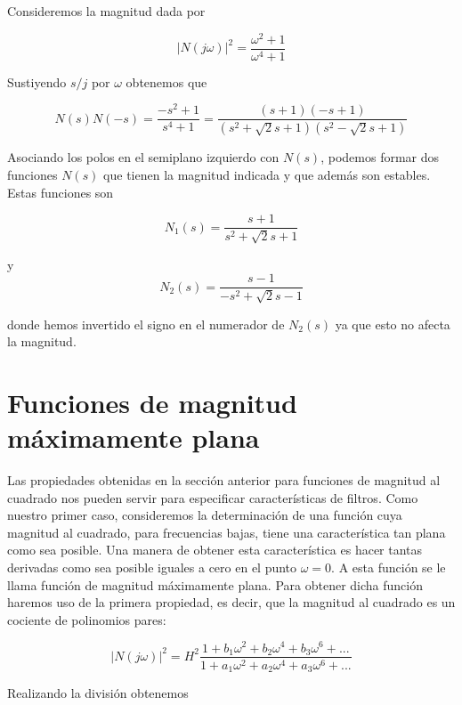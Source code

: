 \documentclass[12pt]{book}
\theoremstyle{definition}
\theoremstyle{remark}
\theoremstyle{plain}
\begin{document}
Consideremos la magnitud dada por

\begin{equation*}
|N(j\omega)|^2=\frac{\omega ^2+1}{\omega ^4 +1}
\end{equation*}

Sustiyendo $s/j$ por $\omega$ obtenemos que

\begin{equation*}
N(s) N(-s)=\frac{-s^2+1}{s^4+1}= \frac{(s+1)(-s+1)}{(s^2+\sqrt{2} s+1)(s^2-\sqrt{2}s+1)}
\end{equation*}

Asociando los polos en el semiplano izquierdo con $N(s)$, podemos formar dos funciones $N(s)$ que tienen la magnitud indicada y que además son estables. Estas funciones son

\begin{equation*}
N_1 (s)= \frac{s+1}{s^2+\sqrt{2} s+1}
\end{equation*}

y 
\begin{equation*}
N_2 (s)= \frac{s-1}{-s^2+\sqrt{2} s-1}
\end{equation*}

donde hemos invertido el signo en el numerador de $N_2 (s)$ ya que esto no afecta la magnitud.

\section{Funciones de magnitud máximamente plana}

Las propiedades obtenidas en la sección anterior para funciones de magnitud al cuadrado nos pueden servir para especificar características de filtros. Como nuestro primer caso, consideremos la determinación de una función cuya magnitud al cuadrado, para frecuencias bajas, tiene una característica tan plana como sea posible. Una manera de obtener esta característica es hacer tantas derivadas como sea posible iguales a cero en el punto $\omega= 0$. A esta función se le llama  función de magnitud máximamente plana. Para obtener dicha función haremos uso de la primera propiedad, es decir, que la magnitud al cuadrado es un cociente de polinomios pares:

\begin{equation}
|N(j\omega)| ^2 = H ^2 \frac{1+b_1 \omega ^2 + b_2 \omega^ 4+ b_3 \omega ^ 6 +...}{1+ a_1 \omega ^2+a_2 \omega ^4+a_3 \omega ^6+...}
\label{equ113}
\end{equation}

Realizando la división obtenemos
\end{document}
